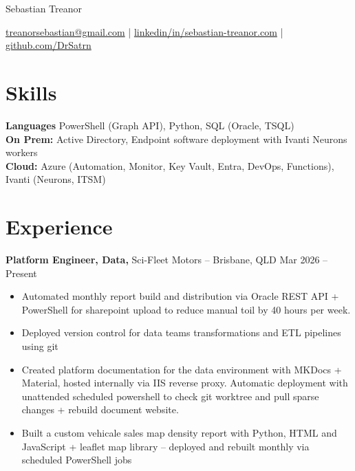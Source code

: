 \documentclass[11pt]{article}       %
\begin{document}
\centerline{\Huge Sebastian Treanor}

\vspace{5pt}

\centerline{\href{mailto:treanorsebastian@gmail.com}{treanorsebastian@gmail.com} %
| \href{https://mitcommlab.mit.edu/meche/commkit/portfolio/}{linkedin/in/sebastian-treanor.com} | \href{https://old.reddit.com/r/EngineeringResumes/wiki/index\#wiki_portfolios}{github.com/DrSatrn}}

\vspace{-10pt}

\section*{Skills}
\textbf{Languages} PowerShell (Graph API), Python, SQL (Oracle, TSQL) \\
\textbf{On Prem:} Active Directory, Endpoint software deployment with Ivanti Neurons workers  \\
\textbf{Cloud:} Azure (Automation, Monitor, Key Vault, Entra, DevOps, Functions), Ivanti (Neurons, ITSM)

\vspace{-6.5pt}

\section*{Experience}
\textbf{Platform Engineer, Data,} {Sci-Fleet Motors} -- Brisbane, QLD \hfill Mar 2026 -- Present \\
\vspace{-9pt}
\begin{itemize}

  \item Automated monthly report build and distribution via Oracle REST API + PowerShell for sharepoint upload to reduce manual toil by 40 hours per week.
  \item Deployed version control for data teams transformations and ETL pipelines using git
  \item Created platform documentation for the data environment with MKDocs + Material, hosted internally via IIS reverse proxy. Automatic deployment with unattended scheduled powershell to check git worktree and pull sparse changes + rebuild document website.
  \item Built a custom vehicale sales map density report with Python, HTML and JavaScript + leaflet map library -- deployed and rebuilt monthly via scheduled PowerShell jobs

\end{itemize}
\end{document}
